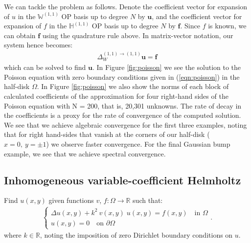 \documentclass[11pt, oneside]{article}   	%
\newcommand{\R}{\mathbb{R}}
\newcommand{\hdop}{H}
\newcommand{\bighdopii}{{\mathbb{\hdop}^{(1,1)}}}
\newcommand{\laplacewii}{\Delta_W^{(1,1)\to(1,1)}}
\newcommand{\bigWii}{{\mathbb{W}^{(1,1)}}}
\begin{document}
We can tackle the problem as follows. Denote the coefficient vector for expansion of $u$ in the $\bigWii$ OP basis up to degree $N$ by $\mathbf{u}$, and the coefficient vector for expansion of $f$ in the $\bighdopii$ OP basis up to degree $N$ by $\mathbf{f}$. Since $f$ is known, we can obtain $\mathbf{f}$ using the quadrature rule above. In matrix-vector notation, our system hence becomes:
\begin{align*}
    \laplacewii \mathbf{u} = \mathbf{f}
\end{align*}
which can be solved to find $\mathbf{u}$.
In Figure \ref{fig:poisson} we see the solution to the Poisson equation with zero boundary conditions given in (\ref{eqn:poisson}) in the half-disk $\Omega$. In Figure \ref{fig:poisson} we also show the norms of each block of calculated coefficients of the approximation for four right-hand sides of the Poisson equation with N = 200, that is, 20,301 unknowns. The rate of decay in the coefficients is a proxy for the rate of convergence of the computed solution. We see that we achieve algebraic convergence for the first three examples, noting that for right hand-sides that vanish at the corners of our half-disk ($x=0, \: y = \pm 1$) we observe faster convergence. For the final Gaussian bump example, we see that we achieve spectral convergence.

\subsection{Inhomogeneous variable-coefficient Helmholtz}

Find \(u(x,y)\) given functions $v$, $f : \Omega \to \R$ such that:
\begin{align}
	\begin{cases}
    		\Delta u(x,y) + k^2 \: v(x,y) \; u(x,y) = f(x,y) \quad \text{in } \Omega \\
		u(x,y) = 0 \quad \text{on } \partial \Omega
	\end{cases}.
	\label{eqn:helmholtz}
\end{align}
where $k \in \R$, noting the imposition of zero Dirichlet boundary conditions on $u$.
\end{document}
